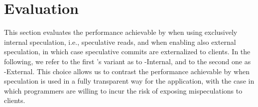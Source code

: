
\section{Evaluation}
\label{sec:evaluation}
This section evaluates the %
 performance achievable by \specula when using exclusively internal speculation, i.e., speculative reads, and when enabling also external speculation, in which case speculative commits are externalized to clients. In the following, we refer to the first \specula's variant as to  {\specula}-Internal, and to the second one as {\specula}-External. This choice allows us to contrast the performance achievable by \specula when speculation is used in a fully transparent way for the application, with the case in which programmers are willing to incur the risk of exposing mispeculations to clients.%

%
%

